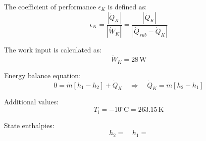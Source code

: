 The coefficient of performance \( \epsilon_K \) is defined as:  
\[
\epsilon_K = \frac{|\dot{Q}_K|}{|\dot{W}_K|} = \frac{|\dot{Q}_K|}{|\dot{Q}_{sub} - \dot{Q}_K|}
\]  

The work input is calculated as:  
\[
\dot{W}_K = 28 \, \text{W}
\]  

Energy balance equation:  
\[
0 = \dot{m} [h_1 - h_2] + \dot{Q}_K \quad \Rightarrow \quad \dot{Q}_K = \dot{m} [h_2 - h_1]
\]  

Additional values:  
\[
T_i = -10^\circ\text{C} = 263.15 \, \text{K}
\]  

State enthalpies:  
\[
h_2 = \quad h_1 =
\]